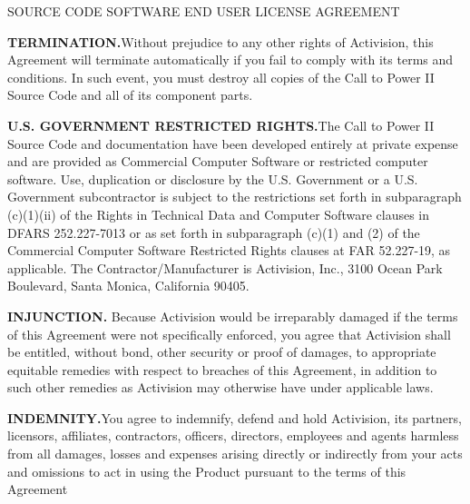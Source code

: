 \begin{section}{SOURCE CODE SOFTWARE END USER LICENSE AGREEMENT}
\begin{flushleft}
\textbf{{\footnotesize TERMINATION.}}{\footnotesize  Without prejudice to any other rights of Activision, this Agreement will terminate automatically if you fail to comply with its terms and conditions. In such event, you must destroy all copies of the Call to Power II Source Code and all of its component parts.}
\end{flushleft}


\begin{flushleft}
\textbf{{\footnotesize U.S. GOVERNMENT RESTRICTED RIGHTS.}}{\footnotesize  The Call to Power II Source Code and documentation have been developed entirely at private expense and are provided as Commercial Computer Software or restricted computer software.  Use, duplication or disclosure by the U.S. Government or a U.S. Government subcontractor is subject to the restrictions set forth in subparagraph (c)(1)(ii) of the Rights in Technical Data and Computer Software clauses in DFARS 252.227-7013 or as set forth in subparagraph (c)(1) and (2) of the Commercial Computer Software Restricted Rights clauses at FAR 52.227-19, as applicable. The Contractor/Manufacturer is Activision, Inc., 3100 Ocean Park Boulevard, Santa Monica, California 90405.}
\end{flushleft}


\begin{flushleft}
\textbf{{\footnotesize INJUNCTION. }}{\footnotesize Because Activision would be irreparably damaged if the terms of this Agreement were not specifically enforced, you agree that Activision shall be entitled, without bond, other security or proof of damages, to appropriate equitable remedies with respect to breaches of this Agreement, in addition to such other remedies as Activision may otherwise have under applicable laws.}
\end{flushleft}


\begin{flushleft}
\textbf{{\footnotesize INDEMNITY.}}{\footnotesize   You agree to indemnify, defend and hold Activision, its partners, licensors, affiliates, contractors, officers, directors, employees and agents harmless from all damages, losses and expenses arising directly or indirectly from your acts and omissions to act in using the Product pursuant to the terms of this Agreement }
\end{flushleft}



\end{section}
